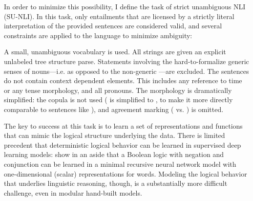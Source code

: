 In order to minimize this possibility, I define the task of strict unambiguous NLI (SU-NLI). In this task, only entailments that are licensed by a strictly literal interpretation of the provided sentences are considered valid, and several constraints are applied to the language to minimize ambiguity:
\begin{itemize}
\ex A small, unambiguous vocabulary is used.
\ex All strings are given an explicit unlabeled tree structure parse.
\ex Statements involving the hard-to-formalize generic senses of nouns---i.e.  as opposed to the non-generic ---are excluded.
\ex The sentences do not contain context dependent elements. This includes any reference to time or any tense morphology, and all pronouns.
\ex The morphology is dramatically simplified: the copula is not used ( is simplified to , to make it more directly comparable to sentences like ), and agreement marking ( vs. ) is omitted.
\end{itemize}

The key to success at this task is to learn a set of representations and functions that can mimic the logical structure underlying the data. There is limited precedent that deterministic logical behavior can be learned in supervised deep learning models: \citet{socher2012semantic} show in an aside that a Boolean logic with negation and conjunction can be learned in a minimal recursive neural network model with one-dimensional (scalar) representations for words. Modeling the logical behavior that underlies linguistic reasoning, though, is a substantially more difficult challenge, even in modular hand-built models.

